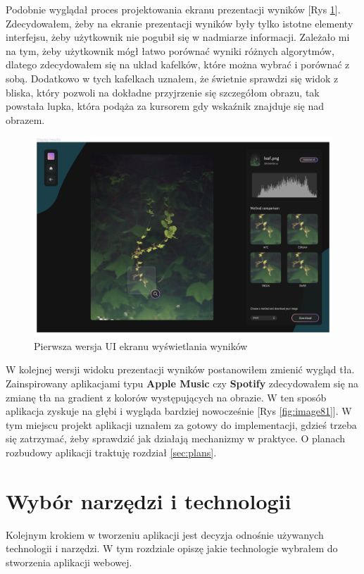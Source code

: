 Podobnie wyglądał proces projektowania ekranu prezentacji wyników [Rys \ref{fig:image86}]. Zdecydowałem, żeby na ekranie prezentacji wyników były tylko istotne elementy interfejsu, żeby użytkownik nie pogubił się w nadmiarze informacji. Zależało mi na tym, żeby użytkownik mógł łatwo porównać wyniki różnych algorytmów, dlatego zdecydowałem się na układ kafelków, które można wybrać i porównać z sobą. Dodatkowo w tych kafelkach uznałem, że świetnie sprawdzi się widok z bliska, który pozwoli na dokładne przyjrzenie się szczegółom obrazu, tak powstała lupka, która podąża za kursorem gdy wskaźnik znajduje się nad obrazem. 


\begin{figure}[H]
    \centering
    \includegraphics[width=0.8\linewidth]{Rozdziały/06.Aplikacja/Obrazy/UI 1 dsiplay .png}  
    \caption{Pierwsza wersja UI ekranu wyświetlania wyników}
    \label{fig:image86}
\end{figure}

W kolejnej wersji widoku prezentacji wyników postanowiłem zmienić wygląd tła. Zainspirowany aplikacjami typu \textbf{Apple Music} czy \textbf{Spotify} zdecydowałem się na zmianę tła na gradient z kolorów występujących na obrazie. W ten sposób aplikacja zyskuje na głębi i wygląda bardziej nowocześnie [Rys \ref{fig:image81}]. W tym miejscu projekt aplikacji uznałem za gotowy do implementacji, gdzieś trzeba się zatrzymać, żeby sprawdzić jak działają mechanizmy w praktyce. O planach rozbudowy aplikacji traktuję rozdział \ref{sec:plans}.



\section{Wybór narzędzi i technologii}

Kolejnym krokiem w tworzeniu aplikacji jest decyzja odnośnie używanych technologii i narzędzi. W tym rozdziale opiszę jakie technologie wybrałem do stworzenia aplikacji webowej. 

